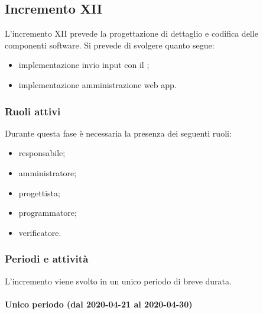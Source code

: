		\subsection{Incremento XII}
			
			L'incremento XII prevede la progettazione di dettaglio e codifica delle componenti software. Si prevede di svolgere quanto segue:
			\begin{itemize}
				\item implementazione invio input con il ;
				\item implementazione amministrazione web app.
			\end{itemize}
			
			\subsubsection{Ruoli attivi}
			
				Durante questa fase è necessaria la presenza dei seguenti ruoli:
				\begin{itemize}
					\item responsabile;
					\item amministratore;
					\item progettista;
					\item programmatore;
					\item verificatore.
				\end{itemize}
			
			\subsubsection{Periodi e attività}
			
				L'incremento viene svolto in un unico periodo di breve durata.
				
				\paragraph{Unico periodo (dal 2020-04-21 al 2020-04-30)}
				
